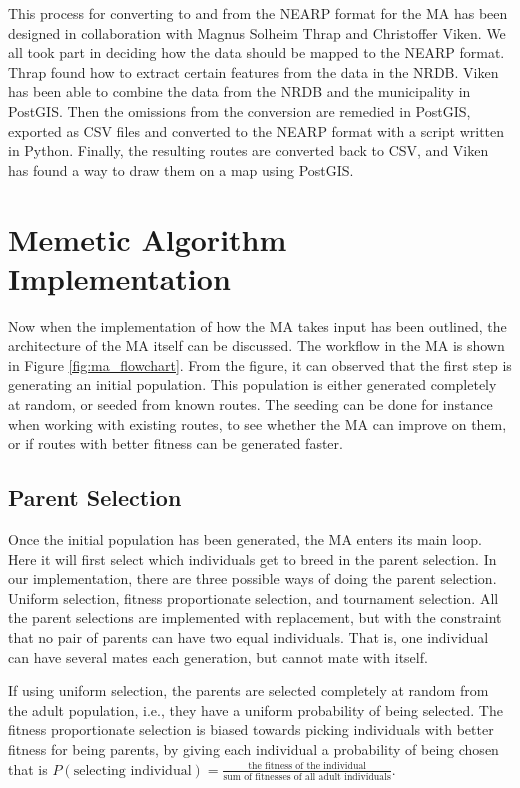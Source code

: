 This process for converting to and from the NEARP format for the MA has been designed in collaboration with Magnus Solheim Thrap and Christoffer Viken. We all took part in deciding how the data should be mapped to the NEARP format. Thrap found how to extract certain features from the data in the NRDB. Viken has been able to combine the data from the NRDB and the municipality in PostGIS. Then the omissions from the conversion are remedied in PostGIS, exported as CSV files and converted to the NEARP format with a script written in Python. Finally, the resulting routes are converted back to CSV, and Viken has found a way to draw them on a map using PostGIS.


\section{Memetic Algorithm Implementation} %
\label{sec:memetic_algorithm_implementation}

Now when the implementation of how the MA takes input has been outlined, the architecture of the MA itself can be discussed. The workflow in the MA is shown in Figure \ref{fig:ma_flowchart}. From the figure, it can observed that the first step is generating an initial population. This population is either generated completely at random, or seeded from known routes. The seeding can be done for instance when working with existing routes, to see whether the MA can improve on them, or if routes with better fitness can be generated faster.

\subsection{Parent Selection} %
\label{sub:achitecture_parent_selection}

Once the initial population has been generated, the MA enters its main loop. Here it will first select which individuals get to breed in the parent selection. In our implementation, there are three possible ways of doing the parent selection. Uniform selection, fitness proportionate selection, and tournament selection. All the parent selections are implemented with replacement, but with the constraint that no pair of parents can have two equal individuals. That is, one individual can have several mates each generation, but cannot mate with itself.

If using uniform selection, the parents are selected completely at random from the adult population, i.e., they have a uniform probability of being selected. The fitness proportionate selection is biased towards picking individuals with better fitness for being parents, by giving each individual a probability of being chosen that is $P(\text{selecting individual}) = \frac{\text{the fitness of the individual}}{\text{sum of fitnesses of all adult individuals}}$.

